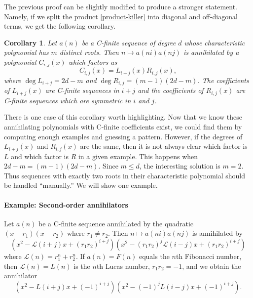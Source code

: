 \documentclass[12pt]{article}
\newtheorem{corollary}{Corollary}
\begin{document}
The previous proof can be slightly modified to produce a stronger statement.
Namely, if we split the product \eqref{product-killer} into diagonal and
off-diagonal terms, we get the following corollary.

\begin{corollary}
    \label{factor-corollary}
    Let $a(n)$ be a C-finite sequence of degree $d$ whose characteristic
    polynomial has $m$ distinct roots. Then $n \mapsto a(ni)a(nj)$ is
    annihilated by a polynomial $C_{i, j}(x)$ which factors as
    \begin{equation}
        C_{i, j}(x) = L_{i + j}(x) R_{i, j}(x),
    \end{equation}
    where $\deg L_{i + j} = 2d - m$ and $\deg R_{i, j} = (m - 1)(2d - m)$. The
    coefficients of $L_{i + j}(x)$ are C-finite sequences in $i + j$ and the
    coefficients of $R_{i, j}(x)$ are C-finite sequences which are symmetric in
    $i$ and $j$.
\end{corollary}

There is one case of this corollary worth highlighting. Now that we know these
annihilating polynomials with C-finite coefficients exist, we could find them
by computing enough examples and guessing a pattern. However, if the degrees of
$L_{i + j}(x)$ and $R_{i, j}(x)$ are the same, then it is not always clear
which factor is $L$ and which factor is $R$ in a given example. This happens
when $2d - m = (m - 1)(2d - m)$. Since $m \leq d$, the interesting solution is
$m = 2$. Thus sequences with exactly two roots in their characteristic
polynomial should be handled ``manually.'' We will show one example.

\paragraph{Example: Second-order annihilators} Let $a(n)$ be a C-finite
sequence annihilated by the quadratic $(x - r_1)(x - r_2)$ where $r_1 \neq
r_2$. Then $n \mapsto a(ni) a(nj)$ is annihilated by
\begin{equation*}
    (x^2 - \mathcal{L}(i + j) x + (r_1 r_2)^{i + j})(x^2 - (r_1 r_2)^j \mathcal{L}(i - j) x + (r_1 r_2)^{i + j})
\end{equation*}
where $\mathcal{L}(n) = r_1^n + r_2^n$. If $a(n) = F(n)$ equals the $n$th
Fibonacci number, then $\mathcal{L}(n) = L(n)$ is the $n$th Lucas number, $r_1
r_2 = -1$, and we obtain the annihilator
\begin{equation*}
    (x^2 - L(i + j) x + (-1)^{i + j})(x^2 - (-1)^j L(i - j) x + (-1)^{i + j}).
\end{equation*}
\end{document}
